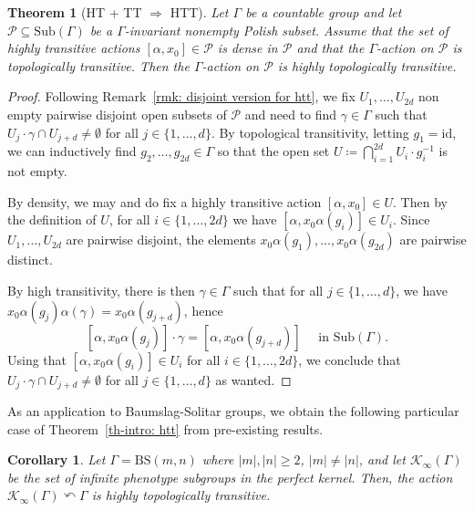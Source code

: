 \documentclass[12pt]{article}
\numberwithin{equation}{section}
\newtheorem{theorem}[equation]{Theorem}
\newtheorem{corollary}[equation]{Corollary}
\theoremstyle{definition}
\newcommand{\inv}{^{-1}}
\newcommand{\abs}[1]{\left\lvert #1\right\rvert}
\newcommand{\PK}{\mathcal{K}}
\def\id{\mathrm{id}}
\newcommand\BSo{\mathrm{BS}}
\newcommand{\Sub}{\mathrm{Sub}}
\begin{document}
\begin{theorem}[HT + TT \(\Rightarrow\) HTT]
	\label{thm: HT + TT implies HTT}
	Let \( \Gamma \) be a countable group and let \(\mathcal P\subseteq \Sub(\Gamma)\) be a \( \Gamma \)-invariant 
	nonempty Polish subset. 
	Assume that the set of highly transitive actions \([\alpha, x_0] \in \mathcal P\) 
	is dense in \(\mathcal P\) and that 
	the \( \Gamma \)-action on \(\mathcal P\) is topologically transitive.
	Then the \( \Gamma \)-action on \(\mathcal P\) is highly topologically transitive.
\end{theorem}
\begin{proof}
	Following Remark~\ref{rmk: disjoint version for htt}, we fix \(U_1,\dots,U_{2d}\) non empty pairwise disjoint open subsets of 
	\(\mathcal P\) and need to find \( \gamma\in\Gamma \) such that \(U_j\cdot \gamma \cap U_{j+d}\neq\emptyset \)
	for all \(j\in \{1,\dots,d\} \). 
	By topological transitivity, letting \( g_1=\id \), we can inductively find 
	\( g_2,\dots,g_{2d}\in\Gamma \)
	so that the open set \( U\coloneqq\bigcap_{i=1}^{2d}  U_i\cdot g_i\inv \) is not empty. 

	By density, we may and do fix a highly transitive action 
	\([\alpha, x_0] \in  U\). Then by the definition of \(U\),
	for all \( i\in \{1,\dots,2d\} \)
	we have \([\alpha, x_0\alpha(g_i)]\in U_i\). 
	Since \(U_1,\dots,U_{2d}\) are pairwise disjoint, the 
	elements \(x_0\alpha(g_1),\dots,x_0\alpha(g_{2d})\) are pairwise distinct.

	By high transitivity, there is then \( \gamma\in\Gamma \) such that for 
	all \( j\in \{1,\dots,d\} \), we have \(x_0\alpha(g_j)\alpha(\gamma)=x_0\alpha(g_{j+d}) \),
	hence \[[\alpha, x_0\alpha(g_j)] \cdot \gamma = [\alpha, x_0\alpha(g_{j+d})] \quad \text{ in } \Sub(\Gamma).\]
	Using that \([\alpha, x_0\alpha(g_i)]\in U_i\) for all \( i\in \{1,\ldots,2d\} \),
	we conclude that \( U_j\cdot\gamma \cap U_{j+d}\neq\emptyset \) 
	for all \( j\in \{1,\dots,d\} \) as wanted.
\end{proof}

As an application to Baumslag-Solitar groups, we obtain the following particular case of Theorem~\ref{th-intro: htt} from pre-existing results.
\begin{corollary}\label{cor: htt from ht and tt for BS}
	Let \( \Gamma = \BSo(m,n) \) where \( \abs{m}, \abs{n} \geq 2 \), \(\abs{m}\neq\abs{n}\),
	and let \( \PK_\infty(\Gamma) \) be the set of infinite phenotype subgroups in the perfect kernel.
	Then, the action \( \PK_\infty(\Gamma) \curvearrowleft \Gamma \) is highly topologically transitive.
\end{corollary}
\end{document}
